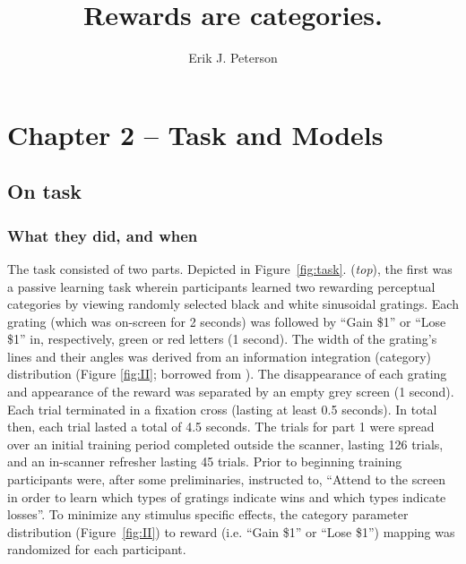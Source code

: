 \documentclass[doc,12pt]{apa}        %
\title{Rewards are categories.}
\author{Erik J. Peterson} \affiliation{Dept. of Psychology \\ Colorado State University \\ Fort Collins, CO}
\begin{document}
 
\maketitle
\doublespacing

\section{Chapter 2 -- Task and Models} %
\label{sec:task_and_models}

\subsection{On task}
\label{sub:to_task}
\subsubsection{What they did, and when}
\label{subsub:whatwhen}
The task consisted of two parts.  Depicted in Figure~\ref{fig:task}. (\emph{top}), the first was a passive learning task wherein participants learned two rewarding perceptual categories by viewing randomly selected black and white sinusoidal gratings.  Each grating (which was on-screen for 2 seconds) was followed by ``Gain \$1'' or ``Lose \$1'' in, respectively, green or red letters (1 second).  The width of the grating's lines and their angles was derived from an information integration (category) distribution (Figure \ref{fig:II}; borrowed from ).  The disappearance of each grating and appearance of the reward was separated by an empty grey screen (1 second).  Each trial terminated in a fixation cross (lasting at least 0.5 seconds). In total then, each trial lasted a total of 4.5 seconds.  The trials for part 1 were spread over an initial training period completed outside the scanner, lasting 126 trials, and an in-scanner refresher lasting 45 trials.  Prior to beginning training participants were, after some preliminaries, instructed to, ``Attend to the screen in order to learn which types of gratings indicate wins and which types indicate losses''.  To minimize any stimulus specific effects, the category parameter distribution (Figure~\ref{fig:II}) to reward (i.e. ``Gain \$1'' or ``Lose \$1'') mapping was randomized for each participant.
\end{document}
